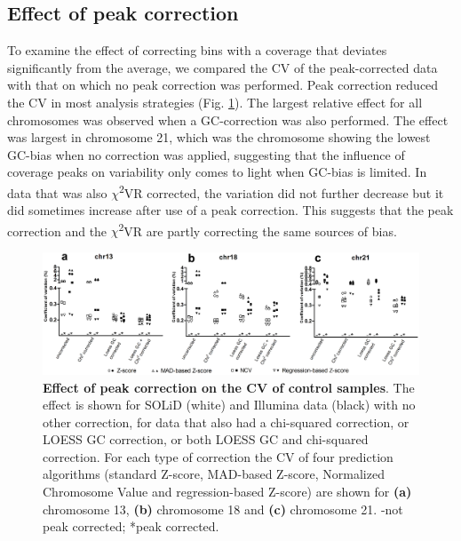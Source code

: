 \subsection{Effect of peak correction}
To examine the effect of correcting bins with a coverage that deviates significantly from the average, we compared the CV of the peak-corrected data with that on which no peak correction was performed. 
Peak correction reduced the CV in most analysis strategies (Fig. \ref{fig:Algorithms_NIPT_Fig2}). 
The largest relative effect for all chromosomes was observed when a GC-correction was also performed. 
The effect was largest in chromosome 21, which was the chromosome showing the lowest GC-bias when no correction was applied, suggesting that the influence of coverage peaks on variability only comes to light when GC-bias is limited. 
In data that was also $\chi$\textsuperscript{2}VR corrected, the variation did not further decrease but it did sometimes increase after use of a peak correction. 
This suggests that the peak correction and the $\chi$\textsuperscript{2}VR are partly correcting the same sources of bias.

\begin{figure}
	\includegraphics[width=1.0\linewidth]{img/Algorithms_NIPT_Fig2}
	\caption[Effect of peak correction]{\textbf{Effect of peak correction on the CV of control samples}. The effect is shown for SOLiD (white) and Illumina data (black) with no other correction, for data that also had a chi-squared correction, or LOESS GC correction, or both LOESS GC and chi-squared correction. For each type of correction the CV of four prediction algorithms (standard Z-score, MAD-based Z-score, Normalized Chromosome Value and regression-based Z-score) are shown for \textbf{(a)} chromosome 13, \textbf{(b)} chromosome 18 and \textbf{(c)} chromosome 21. -not peak corrected; *peak corrected.}
	\label{fig:Algorithms_NIPT_Fig2}
\end{figure}

